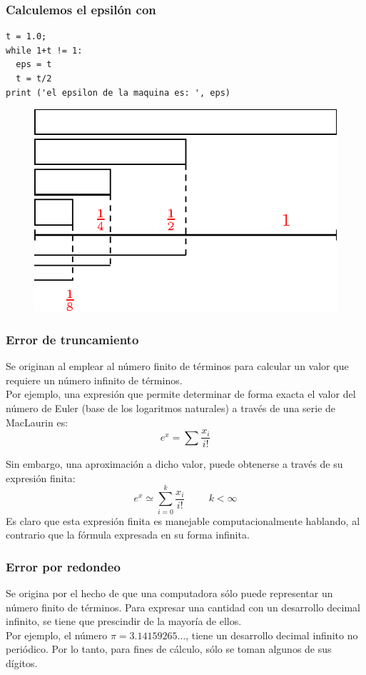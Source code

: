 \begin{frame}[fragile]
\frametitle{Calculemos el epsilón con \python}
\begin{lstlisting}[columns=fullflexible]
t = 1.0;
while 1+t != 1:
  eps = t
  t = t/2
print ('el epsilon de la maquina es: ', eps)
\end{lstlisting}
\begin{figure}
\centering
\includegraphics[scale=1]{epsilonmaquina_02.eps}
\end{figure}
\end{frame}
\begin{frame}
\frametitle{Error de truncamiento}
Se originan al emplear al número finito de términos para calcular un valor que requiere un número infinito de términos.
\\
\bigskip
Por ejemplo, una expresión que permite determinar de forma exacta el valor del número de Euler (base de los logaritmos naturales) a través de una serie de MacLaurin es:
\[ e^{x} = \sum \dfrac{x_{i}}{i!}\]
\end{frame}
\begin{frame}
Sin embargo, una aproximación a dicho valor, puede obtenerse a través de su expresión finita:
\[ e^{x} \simeq \sum_{i=0}^{k} \dfrac{x_{i}}{i!} \hspace{1cm} k<\infty \]
Es claro que esta expresión finita es manejable computacionalmente hablando, al contrario que la fórmula expresada en su forma infinita.
\end{frame}
\begin{frame}
\frametitle{Error por redondeo}
Se origina por el hecho de que una computadora sólo puede representar un número finito de
términos. Para expresar una cantidad con un desarrollo decimal infinito, se tiene que prescindir de la mayoría de ellos.
\\
\bigskip
Por ejemplo, el número $\pi = 3.14159265 \ldots$, tiene un desarrollo decimal infinito no periódico. Por lo tanto, para fines de cálculo, sólo se toman algunos de sus dígitos.
\end{frame}
